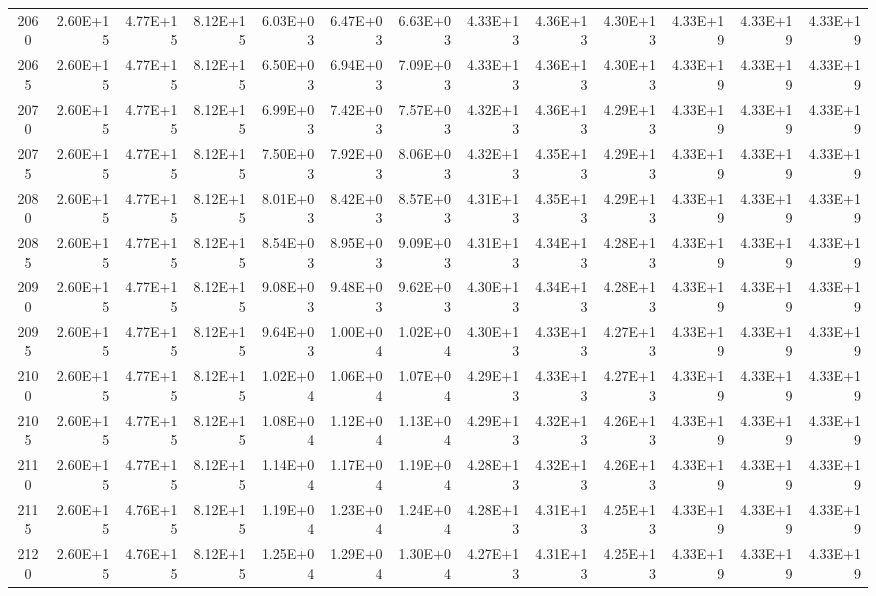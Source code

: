 \documentclass{article}
\begin{document}
\begin{table}
\begin{tabular}{crrr|rrr|rrr|rrr}
2060     & 2.60E+15   & 4.77E+15   & 8.12E+15   & 6.03E+03   & 6.47E+03   & 6.63E+03   & 4.33E+13   & 4.36E+13   & 4.30E+13   & 4.33E+19   & 4.33E+19   & 4.33E+19   \\
2065     & 2.60E+15   & 4.77E+15   & 8.12E+15   & 6.50E+03   & 6.94E+03   & 7.09E+03   & 4.33E+13   & 4.36E+13   & 4.30E+13   & 4.33E+19   & 4.33E+19   & 4.33E+19   \\
2070     & 2.60E+15   & 4.77E+15   & 8.12E+15   & 6.99E+03   & 7.42E+03   & 7.57E+03   & 4.32E+13   & 4.36E+13   & 4.29E+13   & 4.33E+19   & 4.33E+19   & 4.33E+19   \\
2075     & 2.60E+15   & 4.77E+15   & 8.12E+15   & 7.50E+03   & 7.92E+03   & 8.06E+03   & 4.32E+13   & 4.35E+13   & 4.29E+13   & 4.33E+19   & 4.33E+19   & 4.33E+19   \\
2080     & 2.60E+15   & 4.77E+15   & 8.12E+15   & 8.01E+03   & 8.42E+03   & 8.57E+03   & 4.31E+13   & 4.35E+13   & 4.29E+13   & 4.33E+19   & 4.33E+19   & 4.33E+19   \\
2085     & 2.60E+15   & 4.77E+15   & 8.12E+15   & 8.54E+03   & 8.95E+03   & 9.09E+03   & 4.31E+13   & 4.34E+13   & 4.28E+13   & 4.33E+19   & 4.33E+19   & 4.33E+19   \\
2090     & 2.60E+15   & 4.77E+15   & 8.12E+15   & 9.08E+03   & 9.48E+03   & 9.62E+03   & 4.30E+13   & 4.34E+13   & 4.28E+13   & 4.33E+19   & 4.33E+19   & 4.33E+19   \\
2095     & 2.60E+15   & 4.77E+15   & 8.12E+15   & 9.64E+03   & 1.00E+04   & 1.02E+04   & 4.30E+13   & 4.33E+13   & 4.27E+13   & 4.33E+19   & 4.33E+19   & 4.33E+19   \\
2100     & 2.60E+15   & 4.77E+15   & 8.12E+15   & 1.02E+04   & 1.06E+04   & 1.07E+04   & 4.29E+13   & 4.33E+13   & 4.27E+13   & 4.33E+19   & 4.33E+19   & 4.33E+19   \\
2105     & 2.60E+15   & 4.77E+15   & 8.12E+15   & 1.08E+04   & 1.12E+04   & 1.13E+04   & 4.29E+13   & 4.32E+13   & 4.26E+13   & 4.33E+19   & 4.33E+19   & 4.33E+19   \\
2110     & 2.60E+15   & 4.77E+15   & 8.12E+15   & 1.14E+04   & 1.17E+04   & 1.19E+04   & 4.28E+13   & 4.32E+13   & 4.26E+13   & 4.33E+19   & 4.33E+19   & 4.33E+19   \\
2115     & 2.60E+15   & 4.76E+15   & 8.12E+15   & 1.19E+04   & 1.23E+04   & 1.24E+04   & 4.28E+13   & 4.31E+13   & 4.25E+13   & 4.33E+19   & 4.33E+19   & 4.33E+19   \\
2120     & 2.60E+15   & 4.76E+15   & 8.12E+15   & 1.25E+04   & 1.29E+04   & 1.30E+04   & 4.27E+13   & 4.31E+13   & 4.25E+13   & 4.33E+19   & 4.33E+19   & 4.33E+19   \\

\end{tabular}
\end{table}
\end{document}
